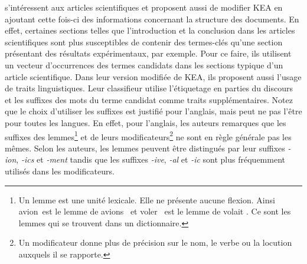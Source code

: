           \citet{nguyen2007keadocumentstructure} s'intéressent aux articles
          scientifiques et proposent aussi de modifier KEA en ajoutant cette fois-ci
          des informations concernant la structure des documents. En effet,
          certaines sections telles que l'introduction et la conclusion dans les
          articles scientifiques sont plus susceptibles de contenir des termes-clés
          qu'une section présentant des résultats expérimentaux, par exemple. Pour
          ce faire, ils utilisent un vecteur d'occurrences des termes candidats dans les
          sections typique d'un article scientifique. Dans leur version modifiée de
          KEA, ils proposent aussi l'usage de traits linguistiques. Leur classifieur
          utilise l'étiquetage en parties du discours et les suffixes des mots du
          terme candidat comme traits supplémentaires. Notez que le choix d'utiliser les
          suffixes est justifié pour l'anglais, mais peut ne pas l'être pour toutes
          les langues. En effet, pour l'anglais, les auteurs remarques que les
          suffixes des lemmes\footnote{Un lemme est une unité lexicale. Elle ne
          présente aucune flexion. Ainsi \og avion\fg\ est le lemme de \og avions
          \fg\ et \og voler \fg\ est le lemme de \og volait \fg. Ce sont les lemmes
          qui se trouvent dans un dictionnaire.} et de leurs
          modificateurs\footnote{Un modificateur donne plus de précision sur le
          nom, le verbe ou la locution auxquels il se rapporte.} ne sont en règle
          générale pas les mêmes. Selon les auteurs, les lemmes peuvent être
          distingués par leur suffixes \textit{-ion}, \textit{-ics} et
          \textit{-ment} tandis que les suffixes \textit{-ive}, \textit{-al} et
          \textit{-ic} sont plus fréquemment utilisés dans les modificateurs.

